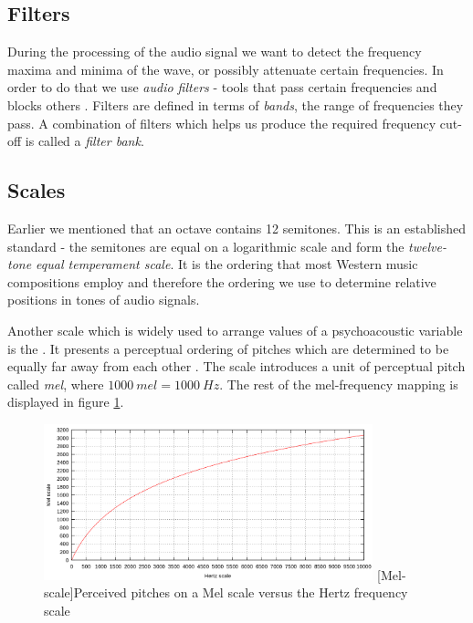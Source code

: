 \subsection{Filters}
\label{subsec:filters}
During the processing of the audio signal we want to detect the frequency maxima
and minima of the wave, or possibly attenuate certain frequencies. In order to
do that we use \textit{audio filters} - tools that pass certain frequencies and
blocks others \cite{filters}. Filters are defined in terms of \textit{bands},
the range of frequencies they pass. A combination of filters which helps us
produce the required frequency cut-off is called a \textit{filter bank}.

\subsection{Scales}
Earlier we mentioned that an octave contains 12 semitones. This is an
established standard - the semitones are equal on a logarithmic scale and form
the \textit{twelve-tone equal temperament scale}. It is the ordering that most
Western music compositions employ and therefore the ordering we use to determine
relative positions in tones of audio signals.

\label{subsec:melscale}
Another scale which is widely used to arrange values of a psychoacoustic
variable is the . It presents a perceptual ordering of pitches
which are determined to be equally far away from each other
\cite{stevens1937scale}. The scale introduces a unit of perceptual pitch called
\textit{mel}, where $1000\:mel = 1000\:Hz$. The rest of the mel-frequency
mapping is displayed in figure \ref{fig:melscale}.

\begin{figure}[H]
    \centering
    \includegraphics[width=0.85\textwidth]{BackgroundTheory/mel-scale.png}
    [Mel-scale]{Perceived pitches on a Mel scale versus the Hertz frequency scale \cite{wiki:melscale}}
    \label{fig:melscale}
\end{figure}

